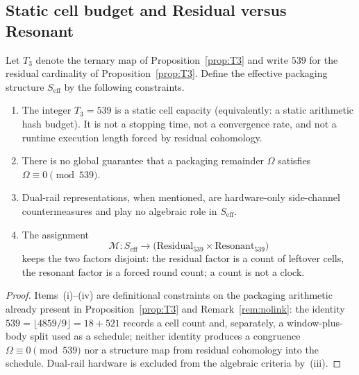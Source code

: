 \subsection{Static cell budget and Residual versus Resonant}
\begin{proposition}\label{prop:Seff}
Let $T_3$ denote the ternary map of Proposition~\ref{prop:T3} and write $539$ for the residual cardinality of Proposition~\ref{prop:T3}. Define the effective packaging structure $S_{\mathrm{eff}}$ by the following constraints.
\begin{enumerate}[label=(\roman*)]
\item The integer $T_3=539$ is a static cell capacity (equivalently: a static arithmetic hash budget). It is not a stopping time, not a convergence rate, and not a runtime execution length forced by residual cohomology.
\item There is no global guarantee that a packaging remainder $\Omega$ satisfies $\Omega\equiv0\pmod{539}$.
\item Dual-rail representations, when mentioned, are hardware-only side-channel countermeasures and play no algebraic role in $S_{\mathrm{eff}}$.
\item The assignment
\[
\mathcal M\colon S_{\mathrm{eff}}\longrightarrow\bigl(\mathrm{Residual}_{539}\times\mathrm{Resonant}_{539}\bigr)
\]
keeps the two factors disjoint: the residual factor is a count of leftover cells, the resonant factor is a forced round count; a count is not a clock.
\end{enumerate}
\end{proposition}
\begin{proof}
Items~(i)--(iv) are definitional constraints on the packaging arithmetic already present in Proposition~\ref{prop:T3} and Remark~\ref{rem:nolink}: the identity $539=\lfloor4859/9\rfloor=18+521$ records a cell count and, separately, a window-plus-body split used as a schedule; neither identity produces a congruence $\Omega\equiv0\pmod{539}$ nor a structure map from residual cohomology into the schedule. Dual-rail hardware is excluded from the algebraic criteria by~(iii).
\end{proof}

